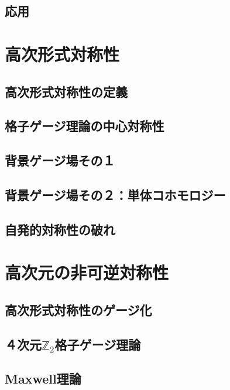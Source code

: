 \documentclass[report,paper=a4, fontsize=12pt, line_length=16cm, number_of_lines=33,dvipdfmx]{jlreq}
\numberwithin{equation}{chapter}
\newcommand{\Ztwo}{\mbox{$\mathbb{Z}_{2}$}}
\begin{document}
\section{応用}


\chapter{高次形式対称性}
\section{高次形式対称性の定義}
\section{格子ゲージ理論の中心対称性}
\section{背景ゲージ場その１}
\section{背景ゲージ場その２：単体コホモロジー}
\section{自発的対称性の破れ}


\chapter{高次元の非可逆対称性}
\section{高次形式対称性のゲージ化}
\section{４次元\texorpdfstring{\Ztwo}{Z2}格子ゲージ理論}
\section{Maxwell理論}



\end{document}
